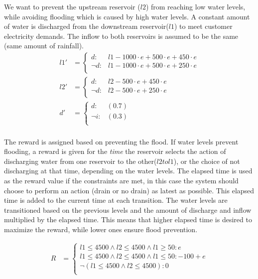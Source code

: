 \documentclass[letterpaper]{article}
\begin{document}
We want to prevent the upstream reservoir ($l2$) from reaching low water levels, while avoiding flooding which is caused by high water levels. A constant amount of water is discharged from the downstream reservoir($l1$) to meet customer electricity demands. The inflow to both reservoirs is assumed to be the same (same amount of rainfall). 
{\footnotesize
\begin{align*}
l1' & = \begin{cases}
d     : & l1 - 1000 \cdot e + 500 \cdot e  +450 \cdot e \\
\neg d: &  l1 - 1000 \cdot e + 500 \cdot e  +250 \cdot e \\
\end{cases}\\
l2' & =  \begin{cases}
d     : & l2 - 500 \cdot e  +450 \cdot e \\
\neg d: &  l2 - 500 \cdot e  +250 \cdot e \\
 \end{cases}\\
d' & = \begin{cases}
d     : & (0.7) \\
\neg i: &  (0.3)   \\
\end{cases}\\
\end{align*}}

The reward is assigned based on preventing the flood. If water levels prevent flooding, a reward is given for the \textit{time} the reservoir selects the action of discharging water from one reservoir to the other($l2 to l1$), or the choice of not discharging at that time, depending on the water levels. The elapsed time is used as the reward value if the constraints are met, in this case the system should choose to perform an action (drain or no drain) as latest as possible. 
This elapsed time is added to the current time at each transition. The water levels are transitioned based on the previous levels and the amount of discharge and inflow multiplied by the elapsed time. This means that higher elapsed time is desired to maximize the reward, while lower ones ensure flood prevention.

{\footnotesize
\begin{align*}
R & = \begin{cases}
l1 \leq 4500 \wedge l2 \leq 4500 \wedge   l1\geq 50 : e \\
l1 \leq 4500 \wedge l2 \leq 4500 \wedge   l1\leq 50 : -100+e \\
\neg(l1 \leq 4500 \wedge l2 \leq 4500) : 0 \\
\end{cases}
\end{align*}}
\end{document}
